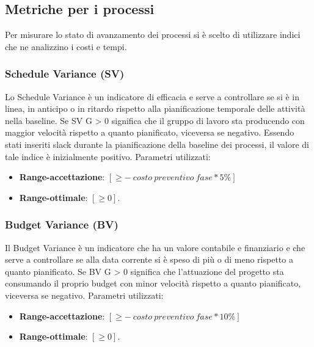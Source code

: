 \subsection{Metriche per i processi}
\label{sezione 3.7}
Per misurare lo stato di avanzamento dei processi si è scelto di utilizzare indici che ne analizzino i costi e
tempi.
\subsubsection{Schedule Variance (SV)}
Lo Schedule Variance è un indicatore di efficacia e serve a controllare se si è in linea, in anticipo o in ritardo rispetto alla pianificazione temporale delle attività nella baseline.
Se SV G > 0 significa che il gruppo di lavoro sta producendo con maggior velocità rispetto a quanto pianificato, viceversa se negativo.
Essendo stati inseriti slack durante la pianificazione della baseline dei processi, il valore di tale indice è inizialmente positivo.
Parametri utilizzati:
\begin{itemize}
	\item \textbf{Range-accettazione}: $\left[  \geq - \: costo \: preventivo \: fase * 5 \% \right]$
	\item \textbf{Range-ottimale}: $\left[\geq 0\right]$.
\end{itemize}
\subsubsection{Budget Variance (BV)}
Il Budget Variance è un indicatore che ha un valore contabile e finanziario e che serve a controllare se alla data corrente si è speso di più o di meno rispetto a quanto pianificato.
Se BV G > 0 significa che l'attuazione del progetto sta consumando il proprio budget con minor velocità rispetto a quanto pianificato, viceversa se negativo.
Parametri utilizzati:
\begin{itemize}
	\item \textbf{Range-accettazione}: $\left[  \geq - \: costo \: preventivo \: fase * 10 \% \right]$
	\item \textbf{Range-ottimale}: $\left[\geq 0\right]$.
\end{itemize}


